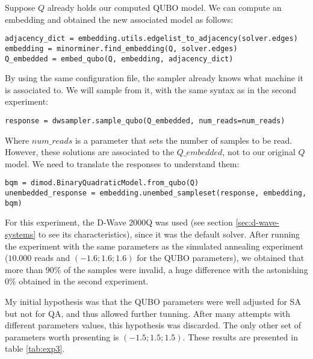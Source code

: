 Suppose $Q$ already holds our computed QUBO model. We can compute an embedding and obtained the new associated model as follows:

\begin{verbatim}
adjacency_dict = embedding.utils.edgelist_to_adjacency(solver.edges)
embedding = minorminer.find_embedding(Q, solver.edges)
Q_embedded = embed_qubo(Q, embedding, adjacency_dict)
\end{verbatim}

By using the same configuration file, the sampler already knows what machine it is associated to. We will sample from it, with the same syntax as in the second experiment:

\begin{verbatim}
response = dwsampler.sample_qubo(Q_embedded, num_reads=num_reads)
\end{verbatim}

Where $num\_reads$ is a parameter that sets the number of samples to be read. However, these solutions are associated to the $Q\_embedded$, not to our original $Q$ model. We need to translate the responses to understand them:

\begin{verbatim}
bqm = dimod.BinaryQuadraticModel.from_qubo(Q)
unembedded_response = embedding.unembed_sampleset(response, embedding, bqm)
\end{verbatim}

For this experiment, the D-Wave 2000Q was used (see section \ref{sec:d-wave-systems} to see its characteristics), since it was the default solver. After running the experiment with the same parameters as the simulated annealing experiment ($10.000$ reads and $(-1.6; 1.6; 1.6)$ for the QUBO parameters), we obtained that more than $90\%$ of the samples were invalid, a huge difference with the astonishing $0\%$ obtained in the second experiment.

My initial hypothesis was that the QUBO parameters were well adjusted for SA but not for QA, and thus allowed further tunning. After many attempts with different parameters values, this hypothesis was discarded. The only other set of parameters worth presenting is $(-1.5; 1.5; 1.5)$. These results are presented in table \ref{tab:exp3}.


